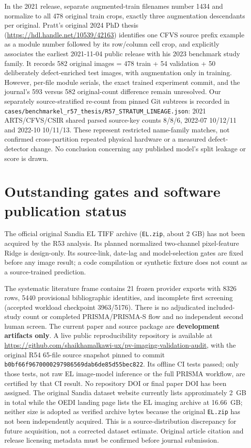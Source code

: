 \documentclass[10pt,a4paper]{article}
\begin{document}
In the 2021 release, separate augmented-train filenames number 1434 and normalize to all 478 original train crops, exactly three augmentation descendants per original. Pratt's original 2024 PhD thesis (\url{https://hdl.handle.net/10539/42163}) identifies one CFVS source prefix example as a module number followed by its row/column cell crop, and explicitly associates the earliest 2021-11-04 public release with his 2023 benchmark study family. It records 582 original images = 478 train + 54 validation + 50 deliberately defect-enriched test images, with augmentation only in training. However, per-file module serials, the exact trained experiment commit, and the journal's 593 versus 582 original-count difference remain unresolved. Our separately source-stratified re-count from pinned Git subtrees is recorded in \texttt{cases/benchmarkel\_r57\_thesis/R57\_STRATUM\_LINEAGE.json}: 2021 ARTS/CFVS/CSIR shared parsed source-key counts 8/8/6, 2022-07 10/12/11 and 2022-10 10/11/13. These represent restricted name-family matches, not confirmed cross-partition repeated physical hardware or a measured defect-detector change. No conclusion concerning any published model's split leakage or score is drawn.

\section{Outstanding gates and software publication status}
The official original Sandia EL TIFF archive (\texttt{EL.zip}, about 2 GB) has not been acquired by the R53 analysis. Its planned normalized two-channel pixel-feature Ridge is design-only. Its source-link, date-lag and model-selection gates are fixed before any image result; a code compilation or synthetic fixture does not count as a source-trained prediction.

The systematic literature frame contains 21 frozen provider exports with 8326 rows, 5440 provisional bibliographic identities, and incomplete first screening (accepted workload checkpoint 3963/5176). There is no adjudicated included-study count or completed PRISMA/PRISMA-S flow and no independent second human screen. The current paper and source package are \textbf{development artifacts only}. A live public reproducibility repository is available at \url{https://github.com/shaikhamalkawi-ux/pv-imaging-validation-audit}, with the original R54 65-file source snapshot pinned to commit \texttt{b0bf66f9670000297986569dab6de85d55bec822}. Its offline CI tests passed; only those tests, not raw EL image-model inference or the full PRISMA workflow, are certified by that CI result. No repository DOI or final paper DOI has been assigned. The original Sandia dataset website currently lists approximately 2~GB in total while the OEDI landing page lists the EL imaging archive at 16.66~GB; neither size is adopted as verified archive bytes because the original \texttt{EL.zip} has not been independently acquired. This is a source-distribution discrepancy for future acquisition, not a corrected dataset estimate. Original article citation and release licensing metadata must be confirmed before journal submission.
\end{document}
